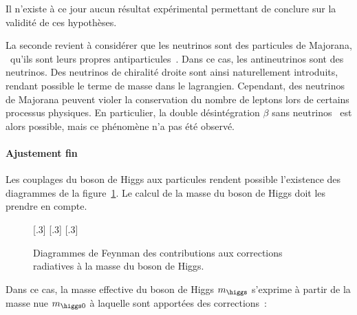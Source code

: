 Il n'existe à ce jour aucun résultat expérimental permettant de conclure sur la validité de ces hypothèses.
\par
La seconde revient à considérer que les neutrinos sont des particules de Majorana,
\ie\ qu'ils sont leurs propres antiparticules~\cite{majorana1,majorana2}.
Dans ce cas, les antineutrinos sont des neutrinos.
Des neutrinos de chiralité droite sont ainsi naturellement introduits, rendant possible le terme de masse dans le lagrangien.
Cependant, des neutrinos de Majorana peuvent violer la conservation du nombre de leptons lors de certains processus physiques.
En particulier, la double désintégration $\beta$ sans neutrinos~\cite{neutrinoless_double_beta,PhysRevD.25.2951} est alors possible,
mais ce phénomène n'a pas été observé.
\paragraph{Ajustement fin}
Les couplages du boson de Higgs aux particules rendent possible l'existence des diagrammes de la figure~\ref{fig-chapter-MS-MSSM-section-succes_limites-subsec-limites-Higgs_loops}.
Le calcul de la masse du boson de Higgs doit les prendre en compte.
\begin{figure}[h]
\centering
{}[.3\textwidth]
{}
\hfill
{}[.3\textwidth]
{}
\hfill
{}[.3\textwidth]
{}

\caption[Diagrammes de Feynman des corrections à la masse du boson de Higgs.]{Diagrammes de Feynman des contributions aux corrections radiatives à la masse du boson de Higgs.}
\label{fig-chapter-MS-MSSM-section-succes_limites-subsec-limites-Higgs_loops}
\end{figure}
\par Dans ce cas, la masse effective du boson de Higgs $m_{\higgs}$ s'exprime à partir de la masse \og nue \fg{} $m_{\higgs 0}$ à laquelle sont apportées des corrections~\cite{Nagashima_BSM}:
